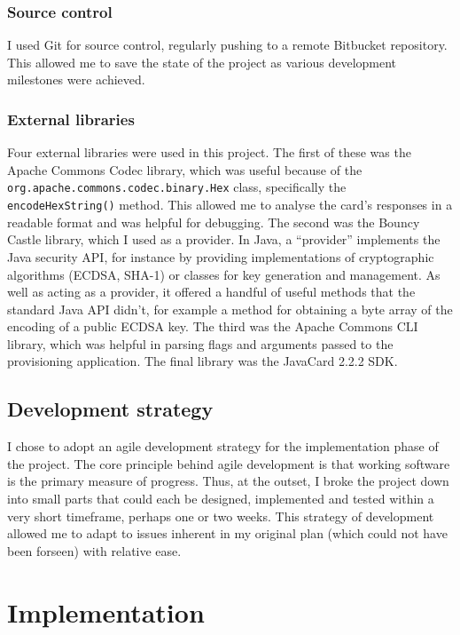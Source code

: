 \documentclass[12pt,a4paper,twoside,openright]{report}
\begin{document}
\subsection{Source control}

I used Git for source control, regularly pushing to a remote Bitbucket repository. This allowed me to save the state of the project as various development milestones were achieved.

\subsection{External libraries}

Four external libraries were used in this project. The first of these was the Apache Commons Codec \cite{apachecommonscodec} library, which was useful because of the \texttt{org.apache.commons.codec.binary.Hex} class, specifically the \texttt{encodeHexString()} method. This allowed me to analyse the card's responses in a readable format and was helpful for debugging. The second was the Bouncy Castle \cite{bouncycastle} library, which I used as a provider. In Java, a ``provider'' implements the Java security API, for instance by providing implementations of cryptographic algorithms (ECDSA, SHA-1) or classes for key generation and management. As well as acting as a provider, it offered a handful of useful methods that the standard Java API didn't, for example a method for obtaining a byte array of the encoding of a public ECDSA key. The third was the Apache Commons CLI \cite{apachecommonscli} library, which was helpful in parsing flags and arguments passed to the provisioning application. The final library was the JavaCard 2.2.2 SDK.

\section{Development strategy}

I chose to adopt an agile development strategy for the implementation phase of the project. The core principle behind agile development is that working software is the primary measure of progress. Thus, at the outset, I broke the project down into small parts that could each be designed, implemented and tested within a very short timeframe, perhaps one or two weeks. This strategy of development allowed me to adapt to issues inherent in my original plan (which could not have been forseen) with relative ease.

\chapter{Implementation}
\end{document}
